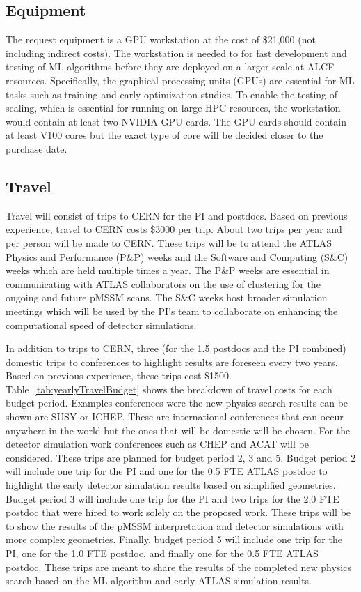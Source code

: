 \documentclass[letter, USenglish, 11pt, subfigure]{article}
\begin{document}
\subsection{Equipment}
\label{subsec:Equipment}
The request equipment is a GPU workstation at the cost of \$21,000 (not including indirect costs). The workstation is needed to for fast development and testing of ML algorithms before they are deployed on a larger scale at ALCF resources. Specifically, the graphical processing units (GPUs) are essential for ML tasks such as training and early optimization studies. To enable the testing of scaling, which is essential for running on large HPC resources, the workstation would contain at least two NVIDIA GPU cards. The GPU cards should contain at least V100 cores but the exact type of core will be decided closer to the purchase date. 

\subsection{Travel}
\label{subsec:travel}
Travel will consist of trips to CERN for the PI and postdocs. Based on previous experience, travel to CERN costs \$3000 per trip. About two trips per year and per person will be made to CERN. These trips will be to attend the ATLAS Physics and Performance (P\&P) weeks and the Software and Computing (S\&C) weeks which are held multiple times a year. The P\&P weeks are essential in communicating with ATLAS collaborators on the use of clustering for the ongoing and future pMSSM scans. The S\&C weeks host broader simulation meetings which will be used by the PI's team to collaborate on enhancing the computational speed of detector simulations.

In addition to trips to CERN, three (for the 1.5 postdocs and the PI combined) domestic trips to conferences to highlight results are foreseen every two years. Based on previous experience, these trips cost \$1500. Table~\ref{tab:yearlyTravelBudget} shows the breakdown of travel costs for each budget period. Examples conferences were the new physics search results can be shown are SUSY or ICHEP. These are international conferences that can occur anywhere in the world but the ones that will be domestic will be chosen. For the detector simulation work conferences such as CHEP and ACAT will be considered. These trips are planned for budget period 2, 3 and 5. Budget period 2 will include one trip for the PI and one for the 0.5 FTE ATLAS postdoc to highlight the early detector simulation results based on simplified geometries. Budget period 3 will include one trip for the PI and two trips for the 2.0 FTE postdoc that were hired to work solely on the proposed work. These trips will be to show the results of the pMSSM interpretation and detector simulations with more complex geometries. Finally, budget period 5 will include one trip for the PI, one for the 1.0 FTE postdoc, and finally one for the 0.5 FTE ATLAS postdoc. These trips are meant to share the results of the completed new physics search based on the ML algorithm and early ATLAS simulation results. 
\end{document}
